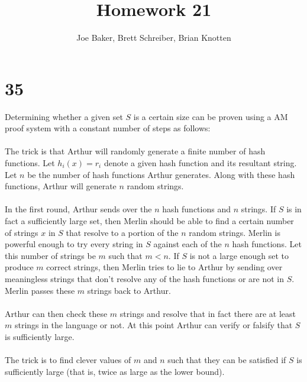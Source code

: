 \documentclass[letterpaper,notitlepage,twoside]{article}
\begin{document}
\title{Homework 21}
\author{Joe Baker, Brett Schreiber, Brian Knotten}
\maketitle

\section*{35}

Determining whether a given set $S$ is a certain size can be proven using a AM proof system with a constant number of steps as follows: \\\\

The trick is that Arthur will randomly generate a finite number of hash functions. Let $h_i(x) = r_i$ denote a given hash function and its resultant string. Let $n$ be the number of hash functions Arthur generates. Along with these hash functions, Arthur will generate $n$ random strings. \\\\

In the first round, Arthur sends over the $n$ hash functions and $n$ strings. If $S$ is in fact a sufficiently large set, then Merlin should be able to find a certain number of strings $x$ in $S$ that resolve to a portion of the $n$ random strings. Merlin is powerful enough to try every string in $S$ against each of the $n$ hash functions. Let this number of strings be $m$ such that $m < n$. If $S$ is not a large enough set to produce $m$ correct strings, then Merlin tries to lie to Arthur by sending over meaningless strings that don't resolve any of the hash functions or are not in $S$. Merlin passes these $m$ strings back to Arthur. \\\\

Arthur can then check these $m$ strings and resolve that in fact there are at least $m$ strings in the language or not. At this point Arthur can verify or falsify that $S$ is sufficiently large. \\\\

The trick is to find clever values of $m$ and $n$ such that they can be satisfied if $S$ is sufficiently large (that is, twice as large as the lower bound). \\\\
\end{document}
